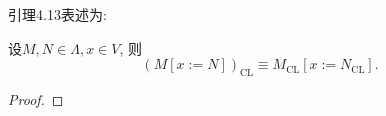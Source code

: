 
引理4.13表述为:

设$M,N\in\Lambda, x\in V$, 则$$(M[x:=N])_{\mathrm{CL}}\equiv M_{\mathrm{CL}}[x:=N_{\mathrm{CL}}].$$

\begin{proof}
\end{proof}